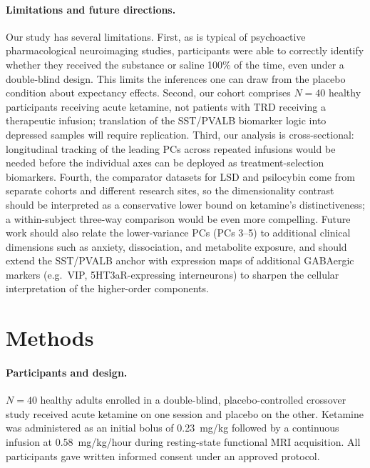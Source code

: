 \documentclass[11pt]{article}
\begin{document}
\paragraph{Limitations and future directions.} Our study has several
limitations. First, as is typical of psychoactive pharmacological
neuroimaging studies, participants were able to correctly identify whether
they received the substance or saline 100\% of the time, even under a
double-blind design. This limits the inferences one can draw from the
placebo condition about expectancy effects. Second, our cohort comprises
$N=40$ healthy participants receiving acute ketamine, not patients with
TRD receiving a therapeutic infusion; translation of the SST/PVALB
biomarker logic into depressed samples will require replication. Third,
our analysis is cross-sectional: longitudinal tracking of the leading PCs
across repeated infusions would be needed before the individual axes can
be deployed as treatment-selection biomarkers. Fourth, the comparator
datasets for LSD and psilocybin come from separate cohorts and different
research sites, so the dimensionality contrast should be interpreted as a
conservative lower bound on ketamine's distinctiveness; a within-subject
three-way comparison would be even more compelling. Future work should
also relate the lower-variance PCs (PCs 3--5) to additional clinical
dimensions such as anxiety, dissociation, and metabolite exposure, and
should extend the SST/PVALB anchor with expression maps of additional
GABAergic markers (e.g.\ VIP, 5HT3aR-expressing interneurons) to sharpen
the cellular interpretation of the higher-order components.

\section{Methods}

\paragraph{Participants and design.} $N=40$ healthy adults enrolled in a
double-blind, placebo-controlled crossover study received acute ketamine
on one session and placebo on the other. Ketamine was administered as an
initial bolus of 0.23~mg/kg followed by a continuous infusion at
0.58~mg/kg/hour during resting-state functional MRI acquisition. All
participants gave written informed consent under an approved protocol.
\end{document}
